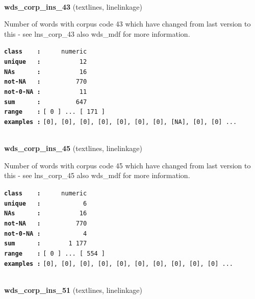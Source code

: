 \documentclass[]{article}
\begin{document}
~

\textbf{wds\_corp\_ins\_43} (textlines, linelinkage)

Number of words with corpus code 43 which have changed from last version
to this - see lns\_corp\_43 also wds\_mdf for more information.

\textbf{\texttt{class\ \ \ \ :}} \texttt{~~~~~numeric}\\
\textbf{\texttt{unique\ \ \ :}} \texttt{~~~~~~~~~~12}\\
\textbf{\texttt{NAs\ \ \ \ \ \ :}} \texttt{~~~~~~~~~~16}\\
\textbf{\texttt{not-NA\ \ \ :}} \texttt{~~~~~~~~~770}\\
\textbf{\texttt{not-0-NA\ :}} \texttt{~~~~~~~~~~11}\\
\textbf{\texttt{sum\ \ \ \ \ \ :}} \texttt{~~~~~~~~~647}\\
\textbf{\texttt{range\ \ \ \ :}}
\texttt{{[}\ 0\ {]}\ ...\ {[}\ 171\ {]}}\\
\textbf{\texttt{examples\ :}}
\texttt{{[}0{]},\ {[}0{]},\ {[}0{]},\ {[}0{]},\ {[}0{]},\ {[}0{]},\ {[}0{]},\ {[}NA{]},\ {[}0{]},\ {[}0{]}\ ...}\\

~

\textbf{wds\_corp\_ins\_45} (textlines, linelinkage)

Number of words with corpus code 45 which have changed from last version
to this - see lns\_corp\_45 also wds\_mdf for more information.

\textbf{\texttt{class\ \ \ \ :}} \texttt{~~~~~numeric}\\
\textbf{\texttt{unique\ \ \ :}} \texttt{~~~~~~~~~~~6}\\
\textbf{\texttt{NAs\ \ \ \ \ \ :}} \texttt{~~~~~~~~~~16}\\
\textbf{\texttt{not-NA\ \ \ :}} \texttt{~~~~~~~~~770}\\
\textbf{\texttt{not-0-NA\ :}} \texttt{~~~~~~~~~~~4}\\
\textbf{\texttt{sum\ \ \ \ \ \ :}} \texttt{~~~~~~~1~177}\\
\textbf{\texttt{range\ \ \ \ :}}
\texttt{{[}\ 0\ {]}\ ...\ {[}\ 554\ {]}}\\
\textbf{\texttt{examples\ :}}
\texttt{{[}0{]},\ {[}0{]},\ {[}0{]},\ {[}0{]},\ {[}0{]},\ {[}0{]},\ {[}0{]},\ {[}0{]},\ {[}0{]},\ {[}0{]}\ ...}\\

~

\textbf{wds\_corp\_ins\_51} (textlines, linelinkage)
\end{document}
